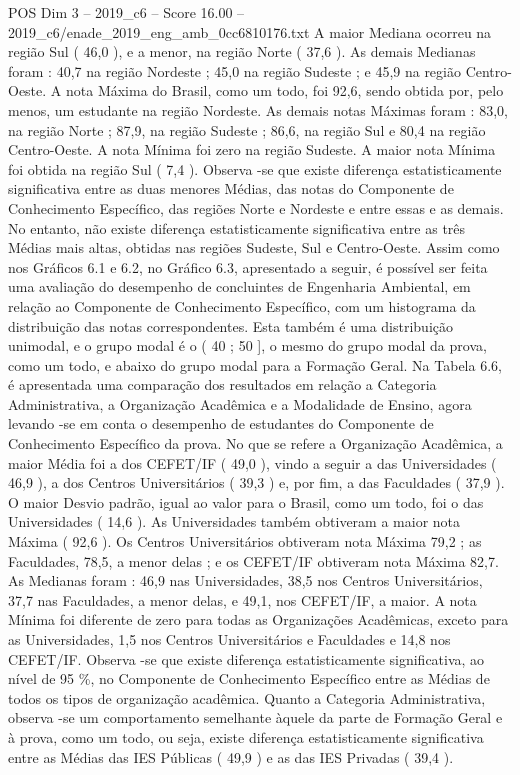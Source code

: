 \begin{textsample}{POS Dim 3 – 2019\_c6 – Score 16.00 – 2019\_c6/enade\_2019\_eng\_amb\_0cc6810176.txt}
A maior Mediana ocorreu na região Sul ( 46,0 ), e a menor, na região Norte ( 37,6 ).
As demais Medianas foram : 40,7 na região Nordeste ; 45,0 na região Sudeste ; e 45,9 na região Centro-Oeste.
A nota Máxima do Brasil, como um todo, foi 92,6, sendo obtida por, pelo menos, um estudante na região Nordeste.
As demais notas Máximas foram : 83,0, na região Norte ; 87,9, na região Sudeste ; 86,6, na região Sul e 80,4 na região Centro-Oeste.
A nota Mínima foi zero na região Sudeste.
A maior nota Mínima foi obtida na região Sul ( 7,4 ).
Observa -se que existe diferença estatisticamente significativa entre as duas menores Médias, das notas do Componente de Conhecimento Específico, das regiões Norte e Nordeste e entre essas e as demais.
No entanto, não existe diferença estatisticamente significativa entre as três Médias mais altas, obtidas nas regiões Sudeste, Sul e Centro-Oeste.
Assim como nos Gráficos 6.1 e 6.2, no Gráfico 6.3, apresentado a seguir, é possível ser feita uma avaliação do desempenho de concluintes de Engenharia Ambiental, em relação ao Componente de Conhecimento Específico, com um histograma da distribuição das notas correspondentes.
Esta também é uma distribuição unimodal, e o grupo modal é o ( 40 ; 50 ], o mesmo do grupo modal da prova, como um todo, e abaixo do grupo modal para a Formação Geral.
Na Tabela 6.6, é apresentada uma comparação dos resultados em relação a Categoria Administrativa, a Organização Acadêmica e a Modalidade de Ensino, agora levando -se em conta o desempenho de estudantes do Componente de Conhecimento Específico da prova.
No que se refere a Organização Acadêmica, a maior Média foi a dos CEFET/IF ( 49,0 ), vindo a seguir a das Universidades ( 46,9 ), a dos Centros Universitários ( 39,3 ) e, por fim, a das Faculdades ( 37,9 ).
O maior Desvio padrão, igual ao valor para o Brasil, como um todo, foi o das Universidades ( 14,6 ).
As Universidades também obtiveram a maior nota Máxima ( 92,6 ).
Os Centros Universitários obtiveram nota Máxima 79,2 ; as Faculdades, 78,5, a menor delas ; e os CEFET/IF obtiveram nota Máxima 82,7.
As Medianas foram : 46,9 nas Universidades, 38,5 nos Centros Universitários, 37,7 nas Faculdades, a menor delas, e 49,1, nos CEFET/IF, a maior.
A nota Mínima foi diferente de zero para todas as Organizações Acadêmicas, exceto para as Universidades, 1,5 nos Centros Universitários e Faculdades e 14,8 nos CEFET/IF.
Observa -se que existe diferença estatisticamente significativa, ao nível de 95 \%, no Componente de Conhecimento Específico entre as Médias de todos os tipos de organização acadêmica.
Quanto a Categoria Administrativa, observa -se um comportamento semelhante àquele da parte de Formação Geral e à prova, como um todo, ou seja, existe diferença estatisticamente significativa entre as Médias das IES Públicas ( 49,9 ) e as das IES Privadas ( 39,4 ).

\end{textsample}
